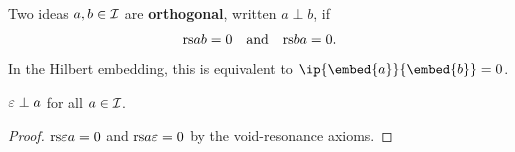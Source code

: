 \begin{definition}[Orthogonality]
\label{def:orthogonal}
Two ideas $a, b \in \mathcal{I}$ are \textbf{orthogonal}, written $a \perp b$, if
\[
  \mathrm{rs}{a}{b} = 0 \quad \text{and} \quad \mathrm{rs}{b}{a} = 0.
\]
In the Hilbert embedding, this is equivalent to
$\ip{\embed{a}}{\embed{b}} = 0$.
\end{definition}

\begin{proposition}
\label{prop:void-orthogonal}
$\varepsilon \perp a$ for all $a \in \mathcal{I}$.
\end{proposition}

\begin{proof}
$\mathrm{rs}{\varepsilon}{a} = 0$ and $\mathrm{rs}{a}{\varepsilon} = 0$ by the void-resonance axioms.
\end{proof}

